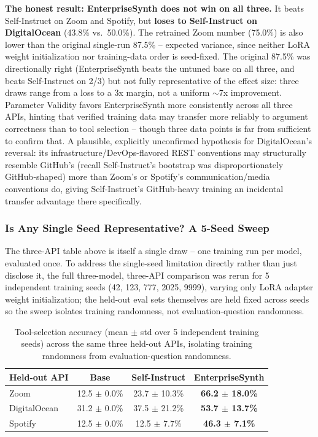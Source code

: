 \documentclass[letterpaper]{article} %
\begin{document}
\textbf{The honest result: EnterpriseSynth does not win on all three.} It beats Self-Instruct on
Zoom and Spotify, but \textbf{loses to Self-Instruct on DigitalOcean} (43.8\% vs.\ 50.0\%). The
retrained Zoom number (75.0\%) is also lower than the original single-run 87.5\% -- expected
variance, since neither LoRA weight initialization nor training-data order is seed-fixed. The
original 87.5\% was directionally right (EnterpriseSynth beats the untuned base on all three, and
beats Self-Instruct on 2/3) but not fully representative of the effect size: three draws range
from a loss to a 3x margin, not a uniform $\sim$7x improvement. Parameter Validity favors
EnterpriseSynth more consistently across all three APIs, hinting that verified training data may
transfer more reliably to argument correctness than to tool selection -- though three data points
is far from sufficient to confirm that. A plausible, explicitly unconfirmed hypothesis for
DigitalOcean's reversal: its infrastructure/DevOps-flavored REST conventions may structurally
resemble GitHub's (recall Self-Instruct's bootstrap was disproportionately GitHub-shaped) more
than Zoom's or Spotify's communication/media conventions do, giving Self-Instruct's GitHub-heavy
training an incidental transfer advantage there specifically.

\subsubsection{Is Any Single Seed Representative? A 5-Seed Sweep}
The three-API table above is itself a single draw -- one training run per model, evaluated once.
To address the single-seed limitation directly rather than just disclose it, the full
three-model, three-API comparison was rerun for 5 independent training seeds (42, 123, 777, 2025, 9999),
varying only LoRA adapter weight initialization; the held-out eval sets themselves are held fixed
across seeds so the sweep isolates training randomness, not evaluation-question randomness.

\begin{table}[htbp]
\centering
\footnotesize
\setlength{\tabcolsep}{2pt}
\caption{Tool-selection accuracy (mean $\pm$ std over 5 independent training seeds) across the
same three held-out APIs, isolating training randomness from evaluation-question randomness.}
\label{tab:exp5-five-seed}
\begin{tabular}{lccc}
\toprule
\textbf{Held-out API} & \textbf{Base} & \textbf{Self-Instruct} & \textbf{EnterpriseSynth} \\
\midrule
Zoom & 12.5 $\pm$ 0.0\% & 23.7 $\pm$ 10.3\% & \textbf{66.2 $\pm$ 18.0\%} \\
DigitalOcean & 31.2 $\pm$ 0.0\% & 37.5 $\pm$ 21.2\% & \textbf{53.7 $\pm$ 13.7\%} \\
Spotify & 12.5 $\pm$ 0.0\% & 12.5 $\pm$ 7.7\% & \textbf{46.3 $\pm$ 7.1\%} \\
\bottomrule
\end{tabular}
\end{table}
\end{document}
